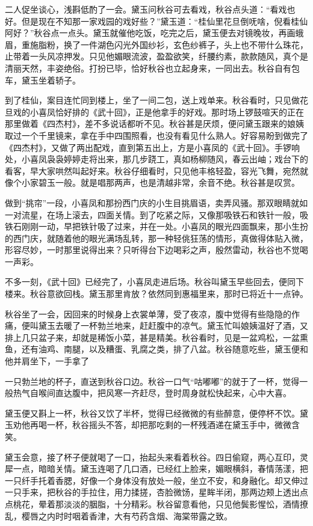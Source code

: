 \documentclass[12pt,UTF8]{ctexbook}
\begin{document}
{{{二人促坐谈心，浅斟低酌了一会。黛玉问秋谷可去看戏，秋谷点头道：“看戏也好。但是现在不知那一家戏园的戏好些？”黛玉道：“桂仙里花旦倒呒啥，倪看桂仙阿好？”秋谷点一点头。黛玉就催他吃饭，吃完之后，黛玉便去对镜晚妆，再画蛾眉，重施脂粉，换了一件湖色闪光外国纱衫，玄色纱裤子，头上也不带什么珠花，止带着一头风凉押发。只见他媚眼流波，盈盈欲笑，纤腰约素，款款随风，真个是清丽天然，丰姿绝俗。打扮已毕，恰好秋谷也立起身来，一同出去。秋谷自有包车，黛玉坐着轿子。

到了桂仙，案目连忙同到楼上，坐了一间二包，送上戏单来。秋谷看时，只见做花旦戏的小喜凤恰好排的《武十回》，正是他拿手的好戏。那时场上锣鼓喧天的正在那里做着《四杰村》，差不多说话都听不见。秋谷甚是厌烦，便问黛玉跟来的娘姨取过一个千里镜来，拿在手中四围照看，也没有看见什么熟人。好容易盼到做完了《四杰村》，又做了两出配戏，直到第五出上，方是小喜凤的《武十回》。手锣响处，小喜凤袅袅婷婷走将出来，那几步跷工，真如杨柳随风，春云出岫；戏台下的看客，早大家哄然叫起好来。秋谷仔细看时，只见他丰格轻盈，容光飞舞，宛然就像个小家碧玉一般。就是唱那两声，也是清越非常，余音不绝。秋谷甚是叹赏。

做到“挑帘”一段，小喜凤和那扮西门庆的小生目挑眉语，卖弄风骚。那双眼睛就如一对流星，在场上滚去，四面关情。到了吃紧之际，又像那吸铁石和铁针一般，吸铁石刚刚一动，早把铁针吸了过来，并在一处。小喜凤的眼光四面飘来，那小生扮的西门庆，就随着他的眼光满场乱转，那一种轻佻狂荡的情形，真做得体贴入微，形容尽妙，一时那里说得出来？只听得台下边喝彩之声，殷然雷动，秋谷也不觉喝一声彩。

不多一刻，《武十回》已经完了，小喜凤走进后场。秋谷叫黛玉早些回去，便同下楼来。秋谷意欲回栈。黛玉那里肯放？依然同到惠福里来，那时已将近十一点钟。

秋谷坐了一会，因回来的时候身上衣裳单薄，受了夜凉，腹中觉得有些隐隐的作痛，便叫黛玉去暖了一杯勃兰地来，赶赶腹中的凉气。黛玉忙叫娘姨温好了酒，又排上几只盆子来，却就是稀饭小菜，甚是精美。秋谷看时，见是一盆鸡松，一盆熏鱼，还有油鸡、南腿，以及糟蛋、乳腐之类，排了八盆。秋谷随意吃些，黛玉便和他并肩坐下，一手拿了

一只勃兰地的杯子，直送到秋谷口边。秋谷一口气“咕嘟嘟”的就于了一杯，觉得一般热气自喉间直达腹中，把风寒一齐赶尽，登时周身就松快起来，心中大喜。

黛玉便又斟上一杯，秋谷又饮了半杯，觉得已经微微的有些醉意，便停杯不饮。黛玉劝他再喝一杯，秋谷摇头不答，却把那吃剩的一杯残酒递在黛玉手中，微微含笑。

黛玉会意，接了杯子便就喝了一口，抬起头来看着秋谷。四日偷窥，两心互印，灵犀一点，暗暗关情。黛玉连喝了几口酒，已经红上脸来，媚眼横斜，春情荡漾，把一只纤手托着香腮，好像一个身体没有放处一般，坐立不安，和身融化。却又伸过一只手来，把秋谷的手拉住，用力揉搓，杏脸微饧，星眸半闭，那两边颊上透出点点桃花，晕着那淡淡的胭脂，十分精彩。秋谷留意看他，只见他鬓影惺忪，酒情撩乱，樱唇之内时时咽着香津，大有芍药含烟、海棠带露之致。

}}}
\end{document}
